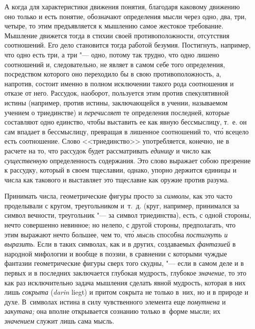 А когда для характеристики движения понятия, благодаря каковому движению оно
только и есть понятие, обозначают определения мысли через одно, два, три,
четыре, то этим предъявляется к мышлению самое жестокое требование. Мышление
движется тогда в стихии своей противоположности, отсутствия соотношений. Его
дело становится тогда работой безумия. Постигнуть, например, что одно есть три,
а три "--- одно, потому так трудно, что одно лишено соотношений и,
следовательно, не являет в самом себе того определения, посредством которого
оно переходило бы в свою противоположность, а, напротив, состоит именно в
полном исключении такого рода соотношения и отказе от него. Рассудок, наоборот,
пользуется этим против спекулятивной истины (например, против истины,
заключающейся в учении, называемом учением о триединстве) и {\em перечисляет}
те определения последней, которые составляют одно единство, чтобы выставить ее
как явную бессмыслицу, т.~е. он сам впадает в бессмыслицу, превращая в лишенное
соотношений то, чт\'{о} всецело есть соотношение. Слово <<триединство>>
употребляется, конечно, не в расчете на то, что рассудок будет рассматривать
{\em единицу} и число как {\em существенную} определенность содержания. Это слово
выражает собою презрение к рассудку, который в своем тщеславии, однако, упорно
держится единицы и числа как такового и выставляет это тщеславие как оружие
против разума.

Принимать числа, геометрические фигуры просто за {\em символы}, как это часто
проделывали с кругом, треугольником и~т.~д. (круг, например, принимался за
символ вечности, треугольник "--- за символ триединства), есть, с одной
стороны, нечто совершенно невинное; но нелепо, с другой стороны, предполагать,
что этим выражают нечто большее, чем то, чт\'{о} {\em мысль} способна
{\em постигнуть и выразить}. Если в таких символах, как и в других, создаваемых
{\em фантазией} в народной мифологии и вообще в поэзии, в сравнении с которыми
чуждые фантазии геометрические фигуры сверх того скудны, "--- если в самом деле
и в первых и в последних заключается глубокая мудрость, глубокое
{\em значение}, то это как раз исключительно задача мышления сделать явной мудрость,
которая в них лишь {\em сокрыта} ({\em \!darin} liegt) и притом сокрыта не только
в~них, но и в природе и духе. В~символах истина в силу чувственного элемента
еще {\em помутнена} и {\em закутана;} она вполне открывается сознанию только
в~форме мысли; их {\em значением} служит лишь сама мысль.

